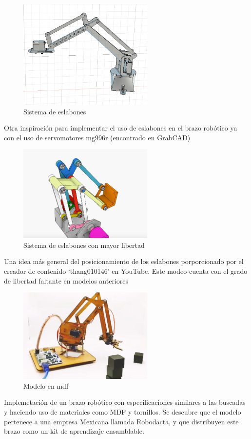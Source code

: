 \begin{figure}[H]
  \centering
  \includegraphics[width=0.6\textwidth]{anexos/inspiraciones/4eslabones.png}
  \caption{Sistema de eslabones}\label{fig:insp.eslabones}
\end{figure}

Otra inspiración para implementar el uso de eslabones en el brazo robótico ya con el uso de servomotores mg996r (encontrado en GrabCAD)

\begin{figure}[H]
  \centering
  \includegraphics[width=0.6\textwidth]{anexos/inspiraciones/5eslabones.png}
  \caption{Sistema de eslabones con mayor libertad}\label{fig:insp.eslabones2}
\end{figure}
Una idea más general del posicionamiento de los eslabones porporcionado por el creador de contenido `thang010146' en YouTube. Este modeo cuenta con el grado de libertad faltante en modelos anteriores

\begin{figure}[H]
  \centering
  \includegraphics[width=0.6\textwidth]{anexos/inspiraciones/6mdf.png}
  \caption{Modelo en mdf}\label{fig:insp.mdf}
\end{figure}
Implemetación de un brazo robótico con especificaciones similares a las buscadas y haciendo uso de materiales como MDF y tornillos. Se descubre que el modelo pertenece a una empresa Mexicana llamada Robodacta, y que distribuyen este brazo como un kit de aprendizaje ensamblable.

